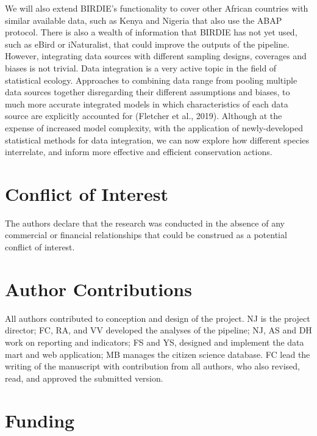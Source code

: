 \documentclass[utf8]{frontiersSCNS}
\begin{document}
We will also extend BIRDIE's functionality to cover other African
countries with similar available data, such as Kenya and Nigeria that
also use the ABAP protocol. There is also a wealth of information that
BIRDIE has not yet used, such as eBird or iNaturalist, that could
improve the outputs of the pipeline. However, integrating data sources
with different sampling designs, coverages and biases is not trivial.
Data integration is a very active topic in the field of statistical
ecology. Approaches to combining data range from pooling multiple data
sources together disregarding their different assumptions and biases, to
much more accurate integrated models in which characteristics of each
data source are explicitly accounted for (Fletcher et al., 2019).
Although at the expense of increased model complexity, with the
application of newly-developed statistical methods for data integration,
we can now explore how different species interrelate, and inform more
effective and efficient conservation actions.

\hypertarget{conflict-of-interest}{%
\section*{Conflict of Interest}\label{conflict-of-interest}}

The authors declare that the research was conducted in the absence of
any commercial or financial relationships that could be construed as a
potential conflict of interest.

\hypertarget{author-contributions}{%
\section*{Author Contributions}\label{author-contributions}}

All authors contributed to conception and design of the project. NJ is
the project director; FC, RA, and VV developed the analyses of the
pipeline; NJ, AS and DH work on reporting and indicators; FS and YS,
designed and implement the data mart and web application; MB manages the
citizen science database. FC lead the writing of the manuscript with
contribution from all authors, who also revised, read, and approved the
submitted version.

\hypertarget{funding}{%
\section*{Funding}\label{funding}}
\end{document}
